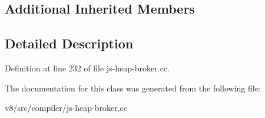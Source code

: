\subsection*{Additional Inherited Members}


\subsection{Detailed Description}


Definition at line 232 of file js-\/heap-\/broker.\+cc.



The documentation for this class was generated from the following file\+:\begin{DoxyCompactItemize}
\item 
v8/src/compiler/js-\/heap-\/broker.\+cc\end{DoxyCompactItemize}
